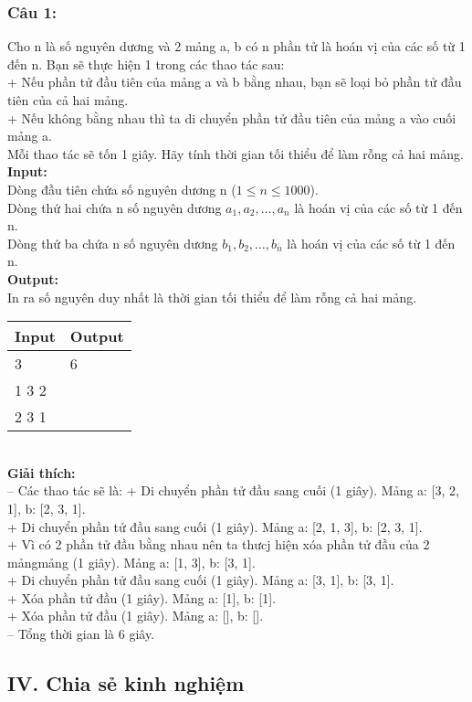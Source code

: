 \subsubsection*{Câu 1: }
Cho n là số nguyên dương và 2 mảng a, b có n phần tử là hoán vị của các số từ 1 đến n. Bạn sẽ thực hiện 1 trong các thao tác sau:\\
+ Nếu phần tử đầu tiên của mảng a và b bằng nhau, bạn sẽ loại bỏ phần tử đầu tiên của cả hai mảng.\\
+ Nếu không bằng nhau thì ta di chuyển phần tử đầu tiên của mảng a vào cuối mảng a.\\
Mỗi thao tác sẽ tốn 1 giây. Hãy tính thời gian tối thiểu để làm rỗng cả hai mảng.\\
\textbf{Input:}\\
Dòng đầu tiên chứa số nguyên dương n ($1 \leq n \leq 1000$).\\
Dòng thứ hai chứa n số nguyên dương $a_1, a_2, \ldots, a_n$ là hoán vị của các số từ 1 đến n.\\
Dòng thứ ba chứa n số nguyên dương $b_1, b_2, \ldots, b_n$ là hoán vị của các số từ 1 đến n.\\
\textbf{Output:}\\
In ra số nguyên duy nhất là thời gian tối thiểu để làm rỗng cả hai mảng.\\
\begin{table}[h!]
    \centering
    \begin{tabularx}{0.8\textwidth}{|X|X|}
        \hline
        \textbf{Input} & \textbf{Output} \\
        \hline
        3 & 6 \\
        1 3 2 &  \\
        2 3 1 &  \\
        \hline
    \end{tabularx}
\end{table}\\
\textbf{Giải thích:}\\
-- Các thao tác sẽ là:
+ Di chuyển phần tử đầu sang cuối (1 giây). Mảng a: [3, 2, 1], b: [2, 3, 1].\\
+ Di chuyển phần tử đầu sang cuối (1 giây). Mảng a: [2, 1, 3], b: [2, 3, 1].\\
+ Vì có 2 phần tử đầu bằng nhau nên ta thưcj hiện xóa phần tử đầu của 2 mảngmảng (1 giây). Mảng a: [1, 3], b: [3, 1].\\
+ Di chuyển phần tử đầu sang cuối (1 giây). Mảng a: [3, 1], b: [3, 1].\\
+ Xóa phần tử đầu (1 giây). Mảng a: [1], b: [1].\\
+ Xóa phần tử đầu (1 giây). Mảng a: [], b: [].\\
-- Tổng thời gian là 6 giây.
\subsection*{IV. Chia sẻ kinh nghiệm}
